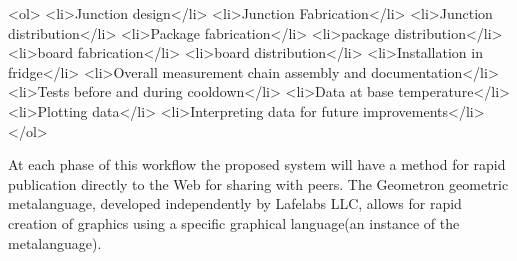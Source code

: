 \documentclass[11pt]{article}
\begin{document}
    <ol>
        <li>Junction design</li>
        <li>Junction Fabrication</li>
        <li>Junction distribution</li>
        <li>Package fabrication</li>
        <li>package distribution</li>
        <li>board fabrication</li>
        <li>board distribution</li>
        <li>Installation in fridge</li>
        <li>Overall measurement chain assembly and documentation</li>
        <li>Tests before and during cooldown</li>
        <li>Data at base temperature</li>
        <li>Plotting data</li>
        <li>Interpreting data for future improvements</li>
    </ol>
    
    


        At each phase of this workflow the proposed system will have a method for rapid publication directly to the Web for sharing with peers.  The Geometron geometric metalanguage, developed independently by Lafelabs LLC, allows for rapid creation of graphics using a specific graphical language(an instance of the metalanguage).   
    
\end{document}
